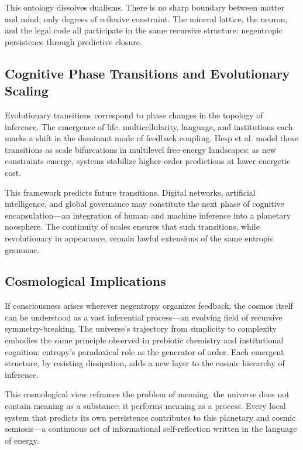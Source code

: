 \documentclass[11pt,a4paper]{article}
\begin{document}
This ontology dissolves dualisms.  There is no sharp boundary between matter and mind, only degrees of reflexive constraint.  The mineral lattice, the neuron, and the legal code all participate in the same recursive structure: negentropic persistence through predictive closure.

\subsection{Cognitive Phase Transitions and Evolutionary Scaling}

Evolutionary transitions correspond to phase changes in the topology of inference.  The emergence of life, multicellularity, language, and institutions each marks a shift in the dominant mode of feedback coupling.  Hesp et al. \citep{Hesp2021DeeplyFeltAffect} model these transitions as scale bifurcations in multilevel free-energy landscapes: as new constraints emerge, systems stabilize higher-order predictions at lower energetic cost.

This framework predicts future transitions.  Digital networks, artificial intelligence, and global governance may constitute the next phase of cognitive encapsulation—an integration of human and machine inference into a planetary noosphere.  The continuity of scales ensures that such transitions, while revolutionary in appearance, remain lawful extensions of the same entropic grammar.

\subsection{Cosmological Implications}

If consciousness arises wherever negentropy organizes feedback, the cosmos itself can be understood as a vast inferential process—an evolving field of recursive symmetry-breaking.  The universe’s trajectory from simplicity to complexity embodies the same principle observed in prebiotic chemistry and institutional cognition: entropy’s paradoxical role as the generator of order.  Each emergent structure, by resisting dissipation, adds a new layer to the cosmic hierarchy of inference.

This cosmological view reframes the problem of meaning: the universe does not contain meaning as a substance; it performs meaning as a process.  Every local system that predicts its own persistence contributes to this planetary and cosmic semiosis—a continuous act of informational self-reflection written in the language of energy.
\end{document}
